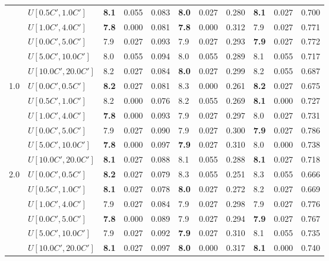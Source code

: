 \begin{table}[h]
{\begin{tabular}{|l|l||l|l|l||l|l|l||l|l|l|}
       & $U[0.5C',1.0C']$ & \textbf{8.1} & 0.055 & 0.083 & \textbf{8.0} & 0.027 & 0.280 & \textbf{8.1} & 0.027 & 0.700 \\
       & $U[1.0C',4.0C']$ & \textbf{7.8} & 0.000 & 0.081 & \textbf{7.8} & 0.000 & 0.312 & 7.9 & 0.027 & 0.771 \\
       & $U[0.0C',5.0C']$ & 7.9 & 0.027 & 0.093 & 7.9 & 0.027 & 0.293 & \textbf{7.9} & 0.027 & 0.772 \\
       & $U[5.0C',10.0C']$ & 8.0 & 0.055 & 0.094 & 8.0 & 0.055 & 0.289 & 8.1 & 0.055 & 0.717 \\
       & $U[10.0C',20.0C']$ & 8.2 & 0.027 & 0.084 & \textbf{8.0} & 0.027 & 0.299 & 8.2 & 0.055 & 0.687 \\
      \hline\hline
      \multirow{6}{*}{1.0} & $U[0.0C',0.5C']$ & \textbf{8.2} & 0.027 & 0.081 & 8.3 & 0.000 & 0.261 & \textbf{8.2} & 0.027 & 0.675 \\
       & $U[0.5C',1.0C']$ & 8.2 & 0.000 & 0.076 & 8.2 & 0.055 & 0.269 & \textbf{8.1} & 0.000 & 0.727 \\
       & $U[1.0C',4.0C']$ & \textbf{7.8} & 0.000 & 0.093 & 7.9 & 0.027 & 0.297 & 8.0 & 0.027 & 0.731 \\
       & $U[0.0C',5.0C']$ & 7.9 & 0.027 & 0.090 & 7.9 & 0.027 & 0.300 & \textbf{7.9} & 0.027 & 0.786 \\
       & $U[5.0C',10.0C']$ & \textbf{7.8} & 0.000 & 0.097 & \textbf{7.9} & 0.027 & 0.310 & 8.0 & 0.000 & 0.738 \\
       & $U[10.0C',20.0C']$ & \textbf{8.1} & 0.027 & 0.088 & 8.1 & 0.055 & 0.288 & \textbf{8.1} & 0.027 & 0.718 \\
      \hline\hline
      \multirow{6}{*}{2.0} & $U[0.0C',0.5C']$ & \textbf{8.2} & 0.027 & 0.079 & 8.3 & 0.055 & 0.251 & 8.3 & 0.055 & 0.666 \\
       & $U[0.5C',1.0C']$ & \textbf{8.1} & 0.027 & 0.078 & \textbf{8.0} & 0.027 & 0.272 & 8.2 & 0.027 & 0.669 \\
       & $U[1.0C',4.0C']$ & 7.9 & 0.027 & 0.084 & 7.9 & 0.027 & 0.298 & 7.9 & 0.027 & 0.776 \\
       & $U[0.0C',5.0C']$ & \textbf{7.8} & 0.000 & 0.089 & 7.9 & 0.027 & 0.294 & \textbf{7.9} & 0.027 & 0.767 \\
       & $U[5.0C',10.0C']$ & 7.9 & 0.027 & 0.092 & \textbf{7.9} & 0.027 & 0.310 & 8.1 & 0.055 & 0.735 \\
       & $U[10.0C',20.0C']$ & \textbf{8.1} & 0.027 & 0.097 & \textbf{8.0} & 0.000 & 0.317 & \textbf{8.1} & 0.000 & 0.740 \\

\end{tabular}}
\end{table}
